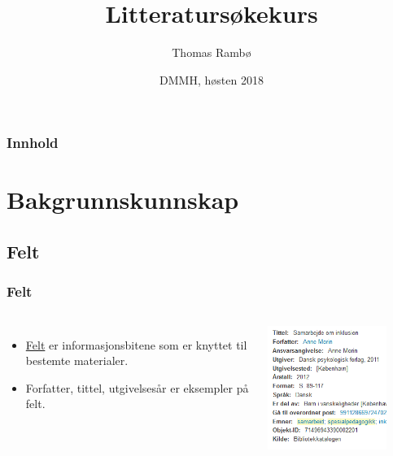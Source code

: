 \documentclass{beamer}
\title{Litteratursøkekurs}
\author{Thomas Rambø\inst{1}}
\institute[DMMH-biblioteket]{
  \inst{1}
  Biblioteket\\
  Dronning Mauds Minne Høgskole
}
\date[DMMH 2018]{DMMH, høsten 2018}
\begin{document}
\frame{\titlepage}
\begin{frame}
  \frametitle{Innhold}
  \tableofcontents
\end{frame}

\section{Bakgrunnskunnskap}
\subsection{Felt}
\begin{frame}
  \frametitle{Felt}
  \begin{columns}
    \begin{itemize}
    \item \href{https://en.wikipedia.org/wiki/Field_(computer_science)}{Felt} er informasjonsbitene som er knyttet til bestemte materialer.
    \item \alert{Forfatter}, \alert{tittel}, \alert{utgivelsesår} er eksempler på felt.
    \end{itemize}

    \centering
    \includegraphics[width=0.8\textwidth]{../media/felt-i-oria.png}
  \end{columns}
\end{frame}
\end{document}
